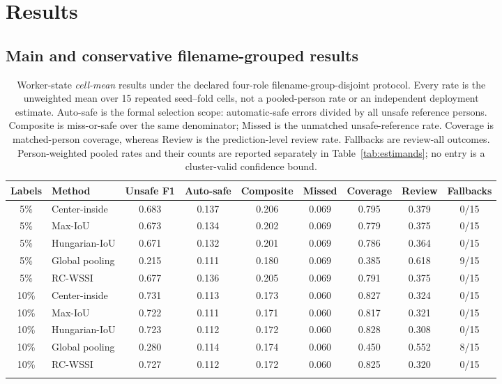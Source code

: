 \documentclass[iicol,pdflatex,sn-mathphys-num]{sn-jnl}
\begin{document}
\section{Results}\label{sec:results}

\subsection{Main and conservative filename-grouped results}

\begin{table}[t]
\caption{Worker-state \emph{cell-mean} results under the declared four-role filename-group-disjoint protocol. Every rate is the unweighted mean over 15 repeated seed--fold cells, not a pooled-person rate or an independent deployment estimate. Auto-safe is the formal selection scope: automatic-safe errors divided by all unsafe reference persons. Composite is miss-or-safe over the same denominator; Missed is the unmatched unsafe-reference rate. Coverage is matched-person coverage, whereas Review is the prediction-level review rate. Fallbacks are review-all outcomes. Person-weighted pooled rates and their counts are reported separately in Table~\ref{tab:estimands}; no entry is a cluster-valid confidence bound.}
\label{tab:main}
\centering
\scriptsize
\setlength{\tabcolsep}{2.5pt}
\begin{tabular}{@{}c l c c c c c c c@{}}
\toprule
Labels & Method & Unsafe F1 & Auto-safe & Composite & Missed & Coverage & Review & Fallbacks \\
\midrule
5\% & Center-inside & 0.683 & 0.137 & 0.206 & 0.069 & 0.795 & 0.379 & 0/15 \\
5\% & Max-IoU & 0.673 & 0.134 & 0.202 & 0.069 & 0.779 & 0.375 & 0/15 \\
5\% & Hungarian-IoU & 0.671 & 0.132 & 0.201 & 0.069 & 0.786 & 0.364 & 0/15 \\
5\% & Global pooling & 0.215 & 0.111 & 0.180 & 0.069 & 0.385 & 0.618 & 9/15 \\
5\% & RC-WSSI & 0.677 & 0.136 & 0.205 & 0.069 & 0.791 & 0.375 & 0/15 \\
\midrule
10\% & Center-inside & 0.731 & 0.113 & 0.173 & 0.060 & 0.827 & 0.324 & 0/15 \\
10\% & Max-IoU & 0.722 & 0.111 & 0.171 & 0.060 & 0.817 & 0.321 & 0/15 \\
10\% & Hungarian-IoU & 0.723 & 0.112 & 0.172 & 0.060 & 0.828 & 0.308 & 0/15 \\
10\% & Global pooling & 0.280 & 0.114 & 0.174 & 0.060 & 0.450 & 0.552 & 8/15 \\
10\% & RC-WSSI & 0.727 & 0.112 & 0.172 & 0.060 & 0.825 & 0.320 & 0/15 \\
\botrule
\end{tabular}
\end{table}
\end{document}
